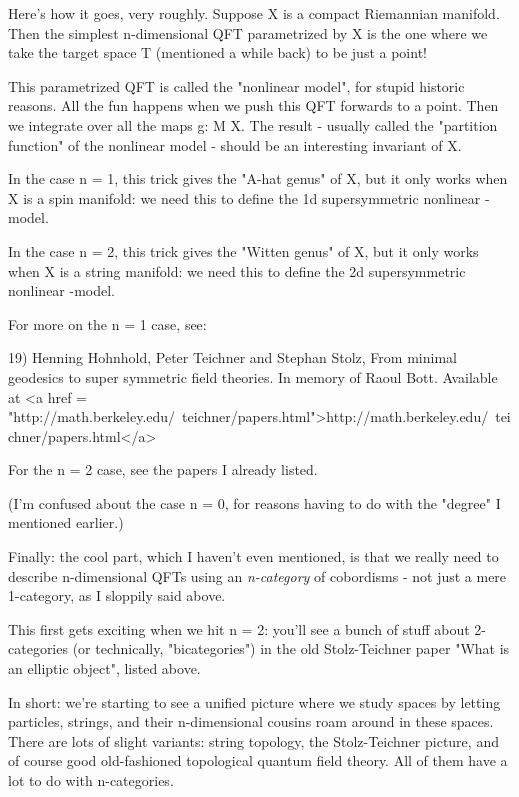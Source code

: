 Here's how it goes, very roughly.  Suppose X is a compact 
Riemannian manifold.  Then the simplest n-dimensional QFT 
parametrized by X is the one where we take the target space T 
(mentioned a while back) to be just a point!  

This parametrized QFT is called the "nonlinear \sigma  model",
for stupid historic reasons.  All the fun happens when we push 
this QFT forwards to a point.  Then we integrate over all the 
maps g: M \to  X.  The result - usually called the "partition 
function" of the nonlinear \sigma  model - should be an interesting
invariant of X.

In the case n = 1, this trick gives the "A-hat genus" of X, 
but it only works when X is a spin manifold: we need this to
define the 1d supersymmetric nonlinear \sigma -model.

In the case n = 2, this trick gives the "Witten genus" of X,
but it only works when X is a string manifold: we need this to
define the 2d supersymmetric nonlinear \sigma -model.  

For more on the n = 1 case, see:

19) Henning Hohnhold, Peter Teichner and Stephan Stolz, From 
minimal geodesics to super symmetric field theories.  In
memory of Raoul Bott.  Available at 
<a href = "http://math.berkeley.edu/~teichner/papers.html">http://math.berkeley.edu/~teichner/papers.html</a>

For the n = 2 case, see the papers I already listed.

(I'm confused about the case n = 0, for reasons having to do
with the "degree" I mentioned earlier.)  

Finally: the cool part, which I haven't even mentioned, is 
that we really need to describe n-dimensional QFTs using an 
\emph{n-category} of cobordisms - not just a mere 1-category, as
I sloppily said above.  

This first gets exciting when we hit n = 2: you'll see a bunch 
of stuff about 2-categories (or technically, "bicategories") 
in the old Stolz-Teichner paper "What is an elliptic object",
listed above.

In short: we're starting to see a unified picture where we
study spaces by letting particles, strings, and their
n-dimensional cousins roam around in these spaces.
There are lots of slight variants: string topology, the 
Stolz-Teichner picture, and of course good old-fashioned
topological quantum field theory.  All of them have a lot
to do with n-categories.


